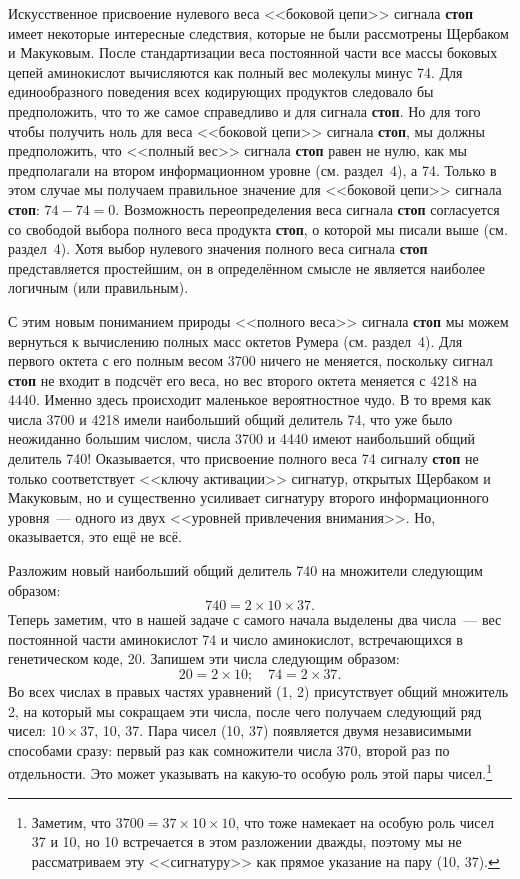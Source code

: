 \documentclass[12pt]{article}
\begin{document}
Искусственное присвоение нулевого веса <<боковой цепи>> сигнала \textbf{стоп} имеет некоторые интересные следствия, которые не были рассмотрены Щербаком и Макуковым. После стандартизации веса постоянной части все массы боковых цепей аминокислот вычисляются как полный вес молекулы минус 74. Для единообразного поведения всех кодирующих продуктов следовало бы предположить, что то же самое справедливо и для сигнала \textbf{стоп}. Но для того чтобы получить ноль для веса <<боковой цепи>> сигнала \textbf{стоп}, мы должны предположить, что <<полный вес>> сигнала \textbf{стоп} равен не нулю, как мы предполагали на втором информационном уровне (см. раздел~4), а 74. Только в этом случае мы получаем правильное значение для <<боковой цепи>> сигнала \textbf{стоп}: $74 - 74 = 0$. Возможность переопределения веса сигнала \textbf{стоп} согласуется со свободой выбора полного веса продукта \textbf{стоп}, о которой мы писали выше (см. раздел~4). Хотя выбор нулевого значения полного веса сигнала \textbf{стоп} представляется простейшим, он в определённом смысле не является наиболее логичным (или правильным).

С этим новым пониманием природы <<полного веса>> сигнала \textbf{стоп} мы можем вернуться к вычислению полных масс октетов Румера (см. раздел~4). Для первого октета с его полным весом 3700 ничего не меняется, поскольку сигнал \textbf{стоп} не входит в подсчёт его веса, но вес второго октета меняется с 4218 на 4440. Именно здесь происходит маленькое вероятностное чудо. В то время как числа 3700 и 4218 имели наибольший общий делитель 74, что уже было неожиданно большим числом, числа 3700 и 4440 имеют наибольший общий делитель 740! Оказывается, что присвоение полного веса 74 сигналу \textbf{стоп} не только соответствует <<ключу активации>> сигнатур, открытых Щербаком и Макуковым, но и существенно усиливает сигнатуру второго информационного уровня~--- одного из двух <<уровней привлечения внимания>>. Но, оказывается, это ещё не всё.

Разложим новый наибольший общий делитель 740 на множители следующим образом:
\begin{equation}
740 = 2 \times 10 \times 37.
\end{equation}
Теперь заметим, что в нашей задаче с самого начала выделены два числа~--- вес постоянной части аминокислот 74 и число аминокислот, встречающихся в генетическом коде, 20. Запишем эти числа следующим образом:
\begin{equation}
20 = 2 \times 10; \quad 74 = 2 \times 37.
\end{equation}
Во всех числах в правых частях уравнений (1, 2) присутствует общий множитель 2, на который мы сокращаем эти числа, после чего получаем следующий ряд чисел: $10 \times 37$, 10, 37. Пара чисел (10, 37) появляется двумя независимыми способами сразу: первый раз как сомножители числа 370, второй раз по отдельности. Это может указывать на какую-то особую роль этой пары чисел.\footnote{Заметим, что $3700 = 37 \times 10 \times 10$, что тоже намекает на особую роль чисел 37 и 10, но 10 встречается в этом разложении дважды, поэтому мы не рассматриваем эту <<сигнатуру>> как прямое указание на пару (10, 37).}
\end{document}
